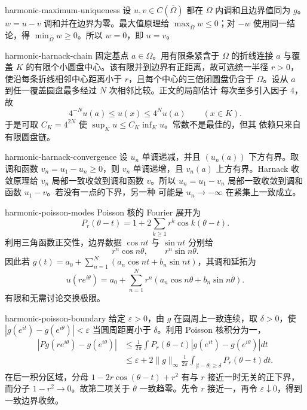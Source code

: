 \begin{solution}{harmonic-maximum-uniqueness}
设 $u,v\in C(\overline\Omega)$ 都在 $\Omega$ 内调和且边界值同为 $g$。
$w=u-v$ 调和并在边界为零。最大值原理给
$\max_{\overline\Omega}w\le0$；对 $-w$ 使用同一结论，得
$\min_{\overline\Omega}w\ge0$。所以 $w=0$，即 $u=v$。
\end{solution}

\begin{solution}{harmonic-harnack-chain}
固定基点 $a\in\Omega$。用有限条紧含于 $\Omega$ 的折线连接 $a$ 与覆盖
$K$ 的有限个小圆盘中心。该有限并到边界有正距离，故可选统一半径 $r>0$，
使沿每条折线相邻中心距离小于 $r$，且每个中心的三倍闭圆盘仍含于
$\Omega$。设从 $a$ 到任一覆盖圆盘最多经过 $N$ 次相邻比较。正文的局部估计
每次至多引入因子 $4$，故
\[
 4^{-N}u(a)\le u(x)\le4^Nu(a)\qquad(x\in K).
\]
于是可取 $C_K=4^{2N}$ 使 $\sup_Ku\le C_K\inf_Ku$。常数不是最佳的，但其
依赖只来自有限圆盘链。
\end{solution}

\begin{solution}{harmonic-harnack-convergence}
设 $u_n$ 单调递减，并且 $(u_n(a))$ 下方有界。取调和函数
$v_n=u_1-u_n\ge0$，则 $v_n$ 单调递增，且 $v_n(a)$ 上方有界。Harnack
收敛原理给 $v_n$ 局部一致收敛到调和函数 $v$。所以
$u_n=u_1-v_n$ 局部一致收敛到调和函数 $u_1-v$。若没有一点的下界，另一种
可能是 $u_n\to-\infty$ 在紧集上一致成立。
\end{solution}

\begin{solution}{harmonic-poisson-modes}
Poisson 核的 Fourier 展开为
\[
 P_r(\theta-t)=1+2\sum_{k\ge1}r^k
 \cos k(\theta-t).
\]
利用三角函数正交性，边界数据 $\cos nt$ 与 $\sin nt$ 分别给
\[
 r^n\cos n\theta,\qquad r^n\sin n\theta.
\]
因此若
$g(t)=a_0+\sum_{n=1}^N(a_n\cos nt+b_n\sin nt)$，其调和延拓为
\[
 u(re^{i\theta})=a_0+
 \sum_{n=1}^Nr^n(a_n\cos n\theta+b_n\sin n\theta).
\]
有限和无需讨论交换极限。
\end{solution}

\begin{solution}{harmonic-poisson-boundary}
给定 $\varepsilon>0$，由 $g$ 在圆周上一致连续，取 $\delta>0$，使
$|g(e^{it})-g(e^{i\theta})|<\varepsilon$ 当圆周距离小于 $\delta$。利用
Poisson 核积分为一，
\begin{align*}
 |Pg(re^{i\theta})-g(e^{i\theta})|
 &\le\frac1{2\pi}\int P_r(\theta-t)
 |g(e^{it})-g(e^{i\theta})|dt\\
 &\le\varepsilon+
 2\|g\|_\infty\frac1{2\pi}
 \int_{|t-\theta|\ge\delta}P_r(\theta-t)dt.
\end{align*}
在后一积分区域，分母
$1-2r\cos(\theta-t)+r^2$ 有与 $r$ 接近一时无关的正下界，而分子
$1-r^2\to0$。故第二项关于 $\theta$ 一致趋零。先令 $r$ 接近一，再令
$\varepsilon\downarrow0$，得到一致边界收敛。
\end{solution}


